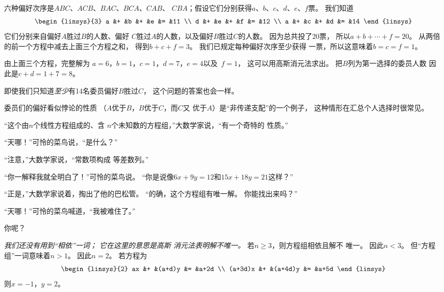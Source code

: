 \begin{exercises}
\begin{answer}
       六种偏好次序是$ABC$、$ACB$、$BAC$、$BCA$、$CAB$、
       $CBA$；假设它们分别获得$a$、$b$、$c$、$d$、$e$、$f$票。
       我们知道
       \begin{equation*}
         \begin{linsys}{3}
           a  &+  &b  &+  &e  &=  &11  \\
           d  &+  &e  &+  &f  &=  &12  \\
           a  &+  &c  &+  &d  &=  &14
         \end{linsys}
       \end{equation*}
       它们分别来自偏好$A$胜过$B$的人数、偏好
       $C$胜过$A$的人数，以及偏好$B$胜过$C$的人数。
       因为总共投了20票，
       所以$a+b+\cdots+f=20$。
       从两倍的前一个方程中减去上面三个方程之和，
       得到$b+c+f=3$。
       我们已规定每种偏好次序至少获得
       一票，所以这意味着$b=c=f=1$。 

       由上面三个方程，完整解为
       $a=6$，$b=1$，$c=1$，$d=7$，$e=4$以及~$f=1$，
       这可以用高斯消元法求出。
       把$B$列为第一选择的委员人数
       因此是$c+d=1+7=8$。

       \par{}
       即使我们只知道{\em 至少\/}有14名委员偏好$B$胜过$C$，
       这个问题的答案也会一样。

       委员们的偏好看似悖论的性质
       （$A$优于$B$，$B$优于$C$，而$C$又
       优于$A$）是“非传递支配”的一个例子，
       这种情形在汇总个人选择时很常见。
     \end{answer}
  \puzzle \item   
     \cite{Monthly63p93}
    “这个由\( n \)个线性方程组成的、含
     \( n \)个未知数的方程组，”大数学家说，“有一个奇特的
     性质。”

     “天哪！”可怜的菜鸟说，“是什么？”

     “注意，”大数学家说，“常数项构成
     等差数列。”

     “你一解释我就全明白了！”可怜的菜鸟说。
     “你是说像\( 6x+9y=12 \)和\( 15x+18y=21 \)这样？”

     “正是，”大数学家说着，掏出了他的巴松管。
     “的确，这个方程组有唯一解。
     你能找出来吗？”

     “天哪！”可怜的菜鸟喊道，“我被难住了。”

     你呢？
     \begin{answer}
       \answerasgiven
       \textit{我们还没有用到“相依”一词；
       它在这里的意思是高斯
       消元法表明解不唯一。}
       若\( n\geq 3 \)，则方程组相依且解不
       唯一。
       因此\( n<3 \)。
       但“方程组”一词意味着\( n>1 \)。
       因此\( n=2 \)。
       若方程为
       \begin{equation*}
         \begin{linsys}{2}
              ax  &+ &(a+d)y  &=  &a+2d  \\
         (a+3d)x  &+ &(a+4d)y &=  &a+5d  
         \end{linsys}
       \end{equation*}
       则\( x=-1 \)，\( y=2 \)。  
    \end{answer}
\end{exercises}







